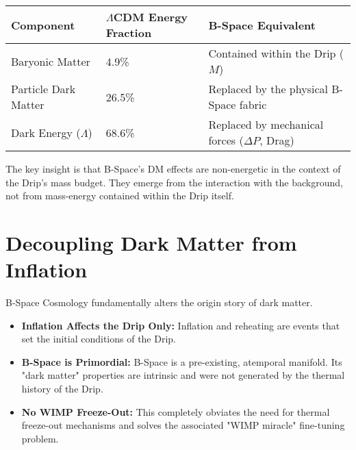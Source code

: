 \documentclass{BSpacePaper} %
\begin{document}
\begin{center}
    \captionsetup{type=table}
    \label{tab:reallocation}
    \begin{tabular}{@{}lll@{}}
    \toprule
    \textbf{Component} & \textbf{\(\Lambda\)CDM Energy Fraction} & \textbf{B-Space Equivalent} \\
    \midrule
    Baryonic Matter & 4.9\% & Contained within the Drip ($M$) \\
    \addlinespace
    Particle Dark Matter & 26.5\% & Replaced by the physical B-Space fabric \\
    \addlinespace
    Dark Energy (\(\Lambda\)) & 68.6\% & Replaced by mechanical forces ($\Delta P$, Drag) \\
    \bottomrule
    \end{tabular}
\end{center}
The key insight is that B-Space's DM effects are non-energetic in the context of the Drip's mass budget. They emerge from the interaction with the background, not from mass-energy contained within the Drip itself.

\section{Decoupling Dark Matter from Inflation}
B-Space Cosmology fundamentally alters the origin story of dark matter.
\begin{itemize}
    \item \textbf{Inflation Affects the Drip Only:} Inflation and reheating are events that set the initial conditions of the Drip.
    \item \textbf{B-Space is Primordial:} B-Space is a pre-existing, atemporal manifold. Its "dark matter" properties are intrinsic and were not generated by the thermal history of the Drip.
    \item \textbf{No WIMP Freeze-Out:} This completely obviates the need for thermal freeze-out mechanisms and solves the associated "WIMP miracle" fine-tuning problem.
\end{itemize}
\end{document}
